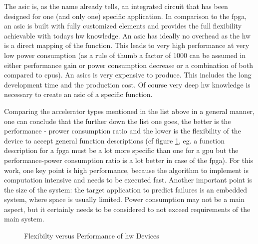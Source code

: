\documentclass[mscthesis]{usiinfthesis}
\begin{document}
\begin{description}
        The \acrfull{asic} is, as the name already tells, an integrated circuit
        that has been designed for one (and only one) specific application. In
        comparison to the \gls{fpga}, an \gls{asic} is built with fully
        customized elements and provides the full flexibility achievable with
        todays \gls{hw} knowledge. An \gls{asic} has ideally no overhead as the
        \gls{hw} is a direct mapping of the function. This leads to very high
        performance at very low power consumption (as a rule of thumb a factor
        of 1000 can be assumed in either performance gain or power consumption
        decrease or a combination of both compared to \glspl{cpu}).  An
        \glspl{asic} is very expensive to produce. This includes the long
        development time and the production cost. Of course very deep \gls{hw}
        knowledge is necessary to create an \gls{asic} of a specific function.
\end{description}

Comparing the accelerator types mentioned in the list above in a general
manner, one can conclude that the further down the list one goes, the better is
the performance - prower consumption ratio and the lower is the flexibility of
the device to accept general function descriptions (cf figure \ref{fig:hw}, eg.
a function description for a \gls{fpga} must be a lot more specific than one for
a \gls{gpu} but the performance-power consumption ratio is a lot better in case of
the \gls{fpga}). For this work, one key point is high performance, because the
algorithm to implement is computation intensive and needs to be executed fast.
Another important point is the size of the system: the target application to
predict failures is an embedded system, where space is usually limited. Power
consumption may not be a main aspect, but it certainly needs to be considered
to not exceed requirements of the main system.

\begin{figure}
    \centering
    
    \caption{Flexibilty versus Performance of \acrshort{hw} Devices}
    \label{fig:hw}
\end{figure}
\end{document}
